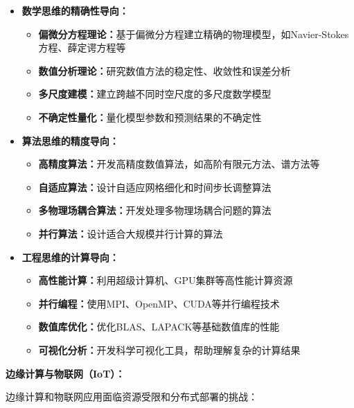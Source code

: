 \begin{itemize}
\item \textbf{数学思维的精确性导向：}
\begin{itemize}
\item \textbf{偏微分方程理论：}基于偏微分方程建立精确的物理模型，如Navier-Stokes方程、薛定谔方程等
\item \textbf{数值分析理论：}研究数值方法的稳定性、收敛性和误差分析
\item \textbf{多尺度建模：}建立跨越不同时空尺度的多尺度数学模型
\item \textbf{不确定性量化：}量化模型参数和预测结果的不确定性
\end{itemize}

\item \textbf{算法思维的精度导向：}
\begin{itemize}
\item \textbf{高精度算法：}开发高精度数值算法，如高阶有限元方法、谱方法等
\item \textbf{自适应算法：}设计自适应网格细化和时间步长调整算法
\item \textbf{多物理场耦合算法：}开发处理多物理场耦合问题的算法
\item \textbf{并行算法：}设计适合大规模并行计算的算法
\end{itemize}

\item \textbf{工程思维的计算导向：}
\begin{itemize}
\item \textbf{高性能计算：}利用超级计算机、GPU集群等高性能计算资源
\item \textbf{并行编程：}使用MPI、OpenMP、CUDA等并行编程技术
\item \textbf{数值库优化：}优化BLAS、LAPACK等基础数值库的性能
\item \textbf{可视化分析：}开发科学可视化工具，帮助理解复杂的计算结果
\end{itemize}
\end{itemize}

\textbf{边缘计算与物联网（IoT）：}

边缘计算和物联网应用面临资源受限和分布式部署的挑战：

